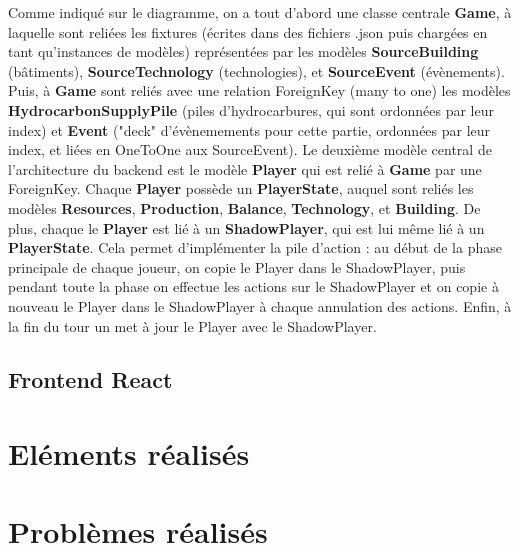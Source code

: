 \documentclass[12pt,twoside,a4paper]{article}
\begin{document}
Comme indiqu\'e sur le diagramme, on a tout d'abord une classe centrale \textbf{Game}, \`a laquelle sont reli\'ees les fixtures (\'ecrites dans des fichiers .json puis charg\'ees en tant qu'instances de mod\`eles) repr\'esent\'ees par les mod\`eles \textbf{SourceBuilding} (b\^atiments), \textbf{SourceTechnology} (technologies), et \textbf{SourceEvent} (\'ev\`enements). Puis, \`a \textbf{Game} sont reli\'es avec une relation ForeignKey (many to one) les mod\`eles \textbf{HydrocarbonSupplyPile} (piles d'hydrocarbures, qui sont ordonn\'ees par leur index) et \textbf{Event} ("deck" d'\'ev\`enemements pour cette partie, ordonn\'ees par leur index, et li\'ees en OneToOne aux SourceEvent). Le deuxi\`eme mod\`ele central de l'architecture du backend est le mod\`ele \textbf{Player} qui est reli\'e \`a \textbf{Game} par une ForeignKey. Chaque \textbf{Player} poss\`ede un \textbf{PlayerState}, auquel sont reli\'es les mod\`eles \textbf{Resources}, \textbf{Production}, \textbf{Balance}, \textbf{Technology}, et \textbf{Building}. De plus, chaque le \textbf{Player} est li\'e \`a un \textbf{ShadowPlayer}, qui est lui m\^eme li\'e \`a un \textbf{PlayerState}. Cela permet d'impl\'ementer la pile d'action : au d\'ebut de la phase principale de chaque joueur, on copie le Player dans le ShadowPlayer, puis pendant toute la phase on effectue les actions sur le ShadowPlayer et on copie \`a nouveau le Player dans le ShadowPlayer \`a chaque annulation des actions. Enfin, \`a la fin du tour un met \`a jour le Player avec le ShadowPlayer.

\subsection{Frontend React}

\section{El\'ements r\'ealis\'es}

\section{Probl\`emes r\'ealis\'es}
\end{document}
